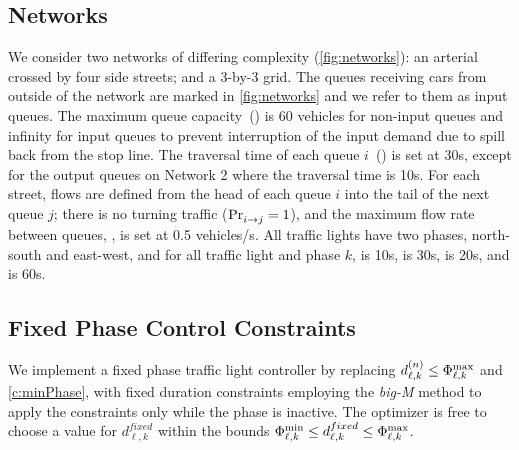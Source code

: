 \subsection{Networks}



\begin{figure*}[t!]
\centering
\caption{(a--c) Networks used to evaluate the QTM performance.
%
(d) Demand profile of the queues marked as \qLowTraf,
\qHighTraf, and \qVarTraf for our experiments.}
\label{fig:networks}
\end{figure*}



We consider two networks of differing complexity (\cref{fig:networks}): an
arterial crossed by four side streets; and a 3-by-3 grid.
%
The queues receiving cars from outside of the network are marked in
\cref{fig:networks} and we refer to them as input queues.
%
The maximum queue capacity~() is 60 vehicles for non-input queues and
infinity for input queues to prevent interruption of the input demand due to
spill back from the stop line. 
%
The traversal time of each queue $i$~() is set at 30s, except for the output queues
on Network 2 where the traversal time is 10s.
%
For each street, flows are defined from the head of each queue $i$ into the tail of the next
queue $j$;
%
there is no turning traffic ($\FTURN{i}{j}=1$), and the maximum flow rate
between queues, , is set at 0.5 vehicles/s.
%
All traffic lights have two phases, north-south and east-west, %
and for all traffic light \tl and phase $k$,   is 10s,  is 30s, 
\CTMIN{\tl} is 20s, and \CTMAX{\tl} is 60s.
%
\subsection{Fixed Phase Control Constraints}

We implement a fixed phase traffic light controller by replacing $\pd[n]{\ell}{k} \le
\PTMAX{\ell}{k}$  and \ref{c:minPhase}, with fixed duration constraints employing the \textit{big-M}
method to apply the constraints only while the phase is inactive. The optimizer is free to choose a value for $d^{fixed}_{\ell,k}$ within the bounds $\PTMIN{\ell}{k} \le d^{fixed}_{\ell,k} \le \PTMAX{\ell}{k}$.

